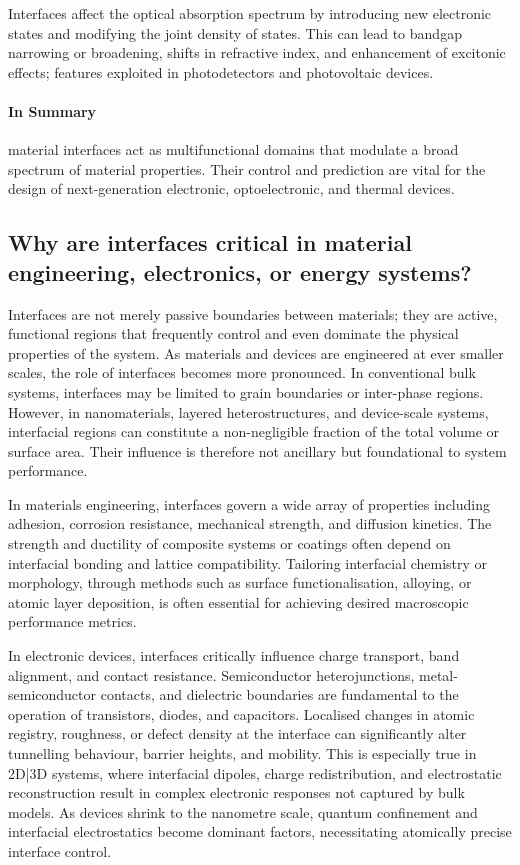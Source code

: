 Interfaces affect the optical absorption spectrum by introducing new electronic states and modifying the joint density of states. This can lead to bandgap narrowing or broadening, shifts in refractive index, and enhancement of excitonic effects; features exploited in photodetectors and photovoltaic devices. 
 
\paragraph{In Summary} material interfaces act as multifunctional domains that modulate a broad spectrum of material properties. Their control and prediction are vital for the design of next-generation electronic, optoelectronic, and thermal devices. 
 
\subsection{Why are interfaces critical in material engineering, electronics, or energy systems?} 
 
Interfaces are not merely passive boundaries between materials; they are active, functional regions that frequently control and even dominate the physical properties of the system. As materials and devices are engineered at ever smaller scales, the role of interfaces becomes more pronounced. In conventional bulk systems, interfaces may be limited to grain boundaries or inter-phase regions. However, in nanomaterials, layered heterostructures, and device-scale systems, interfacial regions can constitute a non-negligible fraction of the total volume or surface area. Their influence is therefore not ancillary but foundational to system performance. 
 
In materials engineering, interfaces govern a wide array of properties including adhesion, corrosion resistance, mechanical strength, and diffusion kinetics. The strength and ductility of composite systems or coatings often depend on interfacial bonding and lattice compatibility. Tailoring interfacial chemistry or morphology, through methods such as surface functionalisation, alloying, or atomic layer deposition, is often essential for achieving desired macroscopic performance metrics. 
 
In electronic devices, interfaces critically influence charge transport, band alignment, and contact resistance. Semiconductor heterojunctions, metal-semiconductor contacts, and dielectric boundaries are fundamental to the operation of transistors, diodes, and capacitors. Localised changes in atomic registry, roughness, or defect density at the interface can significantly alter tunnelling behaviour, barrier heights, and mobility. This is especially true in 2D|3D systems, where interfacial dipoles, charge redistribution, and electrostatic reconstruction result in complex electronic responses not captured by bulk models. As devices shrink to the nanometre scale, quantum confinement and interfacial electrostatics become dominant factors, necessitating atomically precise interface control. 
 
